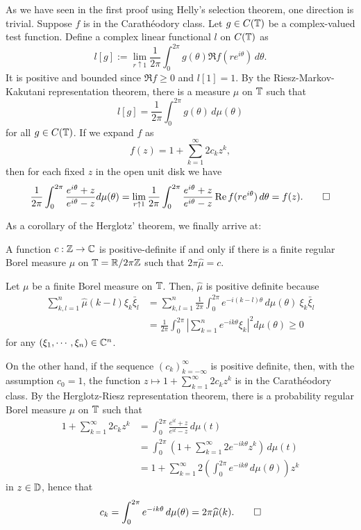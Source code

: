 \documentclass[12pt]{article}
\begin{document}
\begin{pf}
As we have seen in the first proof using Helly's selection theorem, one direction is trivial.
Suppose $f$ is in the Carath\'eodory class.
Let $g\in C(\T)$ be a complex-valued test function.
Define a complex linear functional $l$ on $C(\T)$ as
\[l[g]:=\lim_{r\uparrow1}\frac1{2\pi}\int_0^{2\pi}g(\theta)\Re f(re^{i\theta})\,d\theta.\]
It is positive and bounded since $\Re f\ge0$ and $l[1]=1$.
By the Riesz-Markov-Kakutani representation theorem, there is a measure $\mu$ on $\T$ such that
\[l[g]=\frac1{2\pi}\int_0^{2\pi}g(\theta)\,d\mu(\theta)\]
for all $g\in C(\T)$.
If we expand $f$ as
\[f(z)=1+\sum_{k=1}^\infty2c_kz^k,\]
then for each fixed $z$ in the open unit disk we have
\[\frac1{2\pi}\int_0^{2\pi}\frac{e^{i\theta}+z}{e^{i\theta}-z}d\mu(\theta)
=\lim_{r\uparrow1}\frac1{2\pi}\int_0^{2\pi}\frac{e^{i\theta}+z}{e^{i\theta}-z}\Re f(re^{i\theta})\,d\theta=f(z).\qedhere\]
\end{pf}

As a corollary of the Herglotz' theorem, we finally arrive at:
\begin{cor}
A function $c:\Z\to\C$ is positive-definite if and only if there is a finite regular Borel measure $\mu$ on $\T=\R/2\pi\Z$ such that $2\pi\hat\mu=c$.
\end{cor}
\begin{pf}
Let $\mu$ be a finite Borel measure on $\T$.
Then, $\hat\mu$ is positive definite because
\begin{align*}
\sum_{k,l=1}^n\hat\mu(k-l)\xi_k\bar\xi_l
&=\sum_{k,l=1}^n\frac1{2\pi}\int_0^{2\pi}e^{-i(k-l)\theta}\,d\mu(\theta)\ \xi_k\bar\xi_l\\
&=\frac1{2\pi}\int_0^{2\pi}\left|\sum_{k=1}^ne^{-ik\theta}\xi_k\right|^2d\mu(\theta)\ge0
\end{align*}
for any $(\xi_1,\cdots,\xi_n)\in\C^n$.

On the other hand, if the sequence $(c_k)_{k=-\infty}^\infty$ is positive definite, then, with the assumption $c_0=1$, the function $z\mapsto1+\sum_{k=1}^\infty2c_kz^k$ is in the Carath\'eodory class.
By the Herglotz-Riesz representation theorem, there is a probability regular Borel measure $\mu$ on $\T$ such that
\begin{align*}
1+\sum_{k=1}^\infty2c_kz^k
&=\int_0^{2\pi}\frac{e^{it}+z}{e^{it}-z}\,d\mu(t)\\
&=\int_0^{2\pi}\left(1+\sum_{k=1}^\infty2e^{-ik\theta}z^k\right)\,d\mu(t)\\
&=1+\sum_{k=1}^\infty2\left(\int_0^{2\pi}e^{-ik\theta}\,d\mu(\theta)\right)z^k
\end{align*}
in $z\in\D$, hence that
\[c_k=\int_0^{2\pi}e^{-ik\theta}\,d\mu(\theta)=2\pi\hat\mu(k).\qedhere\]
\end{pf}
\end{document}
